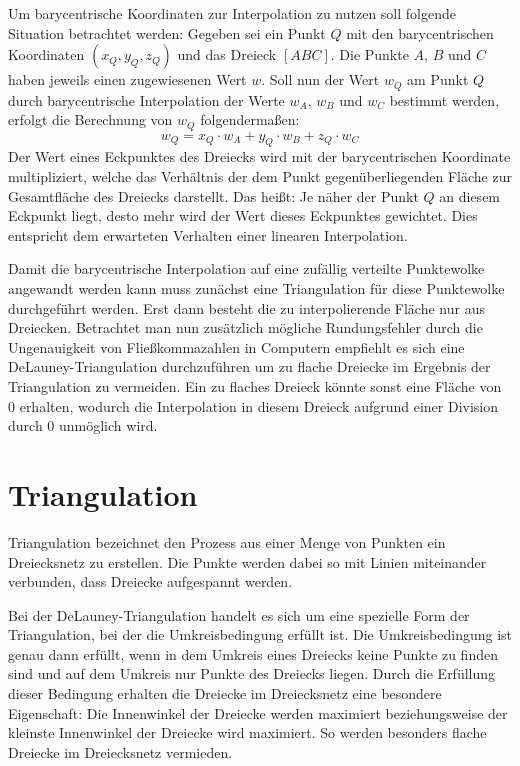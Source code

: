 \documentclass[10pt]{scrartcl}
\begin{document}
Um barycentrische Koordinaten zur Interpolation zu nutzen soll folgende Situation betrachtet werden: Gegeben sei ein Punkt $Q$ mit den barycentrischen Koordinaten $(x_Q, y_Q, z_Q)$ und das Dreieck $[ABC]$. Die Punkte $A$, $B$ und $C$ haben jeweils einen zugewiesenen Wert $w$. Soll nun der Wert $w_Q$ am Punkt $Q$ durch barycentrische Interpolation der Werte $w_A$, $w_B$ und $w_C$ bestimmt werden, erfolgt die Berechnung von $w_Q$ folgendermaßen:
$$
w_Q = x_Q \cdot w_A + y_Q \cdot w_B + z_Q \cdot w_C
$$
Der Wert eines Eckpunktes des Dreiecks wird mit der barycentrischen Koordinate multipliziert, welche das Verhältnis der dem Punkt gegenüberliegenden Fläche zur Gesamtfläche des Dreiecks darstellt. Das heißt: Je näher der Punkt $Q$ an diesem Eckpunkt liegt, desto mehr wird der Wert dieses Eckpunktes gewichtet. Dies entspricht dem erwarteten Verhalten einer linearen Interpolation.

Damit die barycentrische Interpolation auf eine zufällig verteilte Punktewolke angewandt werden kann muss zunächst eine Triangulation für diese Punktewolke durchgeführt werden. Erst dann besteht die zu interpolierende Fläche nur aus Dreiecken. Betrachtet man nun zusätzlich mögliche Rundungsfehler durch die Ungenauigkeit von Fließkommazahlen in Computern empfiehlt es sich eine DeLauney-Triangulation durchzuführen um zu flache Dreiecke im Ergebnis der Triangulation zu vermeiden. Ein zu flaches Dreieck könnte sonst eine Fläche von $0$ erhalten, wodurch die Interpolation in diesem Dreieck aufgrund einer Division durch $0$ unmöglich wird.

\section{Triangulation}
\label{Triangulation}
Triangulation bezeichnet den Prozess aus einer Menge von Punkten ein Dreiecksnetz zu erstellen. Die Punkte werden dabei so mit Linien miteinander verbunden, dass Dreiecke aufgespannt werden.

Bei der DeLauney-Triangulation handelt es sich um eine spezielle Form der Triangulation, bei der die Umkreisbedingung erfüllt ist. Die Umkreisbedingung ist genau dann erfüllt, wenn in dem Umkreis eines Dreiecks keine Punkte zu finden sind und auf dem Umkreis nur Punkte des Dreiecks liegen. Durch die Erfüllung dieser Bedingung erhalten die Dreiecke im Dreiecksnetz eine besondere Eigenschaft: Die Innenwinkel der Dreiecke werden maximiert beziehungsweise der kleinste Innenwinkel der Dreiecke wird maximiert. So werden besonders flache Dreiecke im Dreiecksnetz vermieden.
\end{document}
